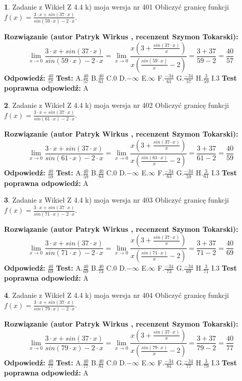 \documentclass[12pt, a4paper]{article}
\theoremstyle{definition} %
\newtheorem{zad}{}
\newcommand{\zadStart}[1]{\begin{zad}#1\newline}
\newcommand{\zadStop}{\end{zad}}
\newcommand{\rozwStart}[2]{\noindent \textbf{Rozwiązanie (autor #1 , recenzent #2): }\newline}
\newcommand{\rozwStop}{\newline}
\newcommand{\odpStart}{\noindent \textbf{Odpowiedź:}\newline}
\newcommand{\odpStop}{\newline}
\newcommand{\testStart}{\noindent \textbf{Test:}\newline}
\newcommand{\testStop}{\newline}
\newcommand{\kluczStart}{\noindent \textbf{Test poprawna odpowiedź:}\newline}
\newcommand{\kluczStop}{\newline}
\begin{document}
\zadStart{Zadanie z Wikieł Z 4.4 k) moja wersja nr 401}
Obliczyć granicę funkcji $f(x)=\frac{3\cdot x +sin(37\cdot x)}{sin(59\cdot x) -2\cdot x}$.
\zadStop
\rozwStart{Patryk Wirkus}{Szymon Tokarski}
$$\lim\limits_{x\to 0}\frac{3\cdot x +sin(37\cdot x)}{sin(59\cdot x) -2\cdot x}
=\lim\limits_{x\to 0}\frac{x(3+\frac{sin(37\cdot x)}{x})}{x(\frac{sin(59\cdot x)}{x}-2)}
=\frac{3+37}{59-2} = \frac{40}{57}$$
\rozwStop
\odpStart
$\frac{40}{57}$
\odpStop
\testStart
A.$\frac{40}{57}$
B.$\frac{40}{61}$
C.$0$
D.$-\infty$
E.$\infty$
F.$\frac{-34}{61}$
G.$\frac{-34}{57}$
H.$\frac{3}{59}$
I.$3$
\testStop
\kluczStart
A
\kluczStop



\zadStart{Zadanie z Wikieł Z 4.4 k) moja wersja nr 402}
Obliczyć granicę funkcji $f(x)=\frac{3\cdot x +sin(37\cdot x)}{sin(61\cdot x) -2\cdot x}$.
\zadStop
\rozwStart{Patryk Wirkus}{Szymon Tokarski}
$$\lim\limits_{x\to 0}\frac{3\cdot x +sin(37\cdot x)}{sin(61\cdot x) -2\cdot x}
=\lim\limits_{x\to 0}\frac{x(3+\frac{sin(37\cdot x)}{x})}{x(\frac{sin(61\cdot x)}{x}-2)}
=\frac{3+37}{61-2} = \frac{40}{59}$$
\rozwStop
\odpStart
$\frac{40}{59}$
\odpStop
\testStart
A.$\frac{40}{59}$
B.$\frac{40}{63}$
C.$0$
D.$-\infty$
E.$\infty$
F.$\frac{-34}{63}$
G.$\frac{-34}{59}$
H.$\frac{3}{61}$
I.$3$
\testStop
\kluczStart
A
\kluczStop



\zadStart{Zadanie z Wikieł Z 4.4 k) moja wersja nr 403}
Obliczyć granicę funkcji $f(x)=\frac{3\cdot x +sin(37\cdot x)}{sin(71\cdot x) -2\cdot x}$.
\zadStop
\rozwStart{Patryk Wirkus}{Szymon Tokarski}
$$\lim\limits_{x\to 0}\frac{3\cdot x +sin(37\cdot x)}{sin(71\cdot x) -2\cdot x}
=\lim\limits_{x\to 0}\frac{x(3+\frac{sin(37\cdot x)}{x})}{x(\frac{sin(71\cdot x)}{x}-2)}
=\frac{3+37}{71-2} = \frac{40}{69}$$
\rozwStop
\odpStart
$\frac{40}{69}$
\odpStop
\testStart
A.$\frac{40}{69}$
B.$\frac{40}{73}$
C.$0$
D.$-\infty$
E.$\infty$
F.$\frac{-34}{73}$
G.$\frac{-34}{69}$
H.$\frac{3}{71}$
I.$3$
\testStop
\kluczStart
A
\kluczStop



\zadStart{Zadanie z Wikieł Z 4.4 k) moja wersja nr 404}
Obliczyć granicę funkcji $f(x)=\frac{3\cdot x +sin(37\cdot x)}{sin(79\cdot x) -2\cdot x}$.
\zadStop
\rozwStart{Patryk Wirkus}{Szymon Tokarski}
$$\lim\limits_{x\to 0}\frac{3\cdot x +sin(37\cdot x)}{sin(79\cdot x) -2\cdot x}
=\lim\limits_{x\to 0}\frac{x(3+\frac{sin(37\cdot x)}{x})}{x(\frac{sin(79\cdot x)}{x}-2)}
=\frac{3+37}{79-2} = \frac{40}{77}$$
\rozwStop
\odpStart
$\frac{40}{77}$
\odpStop
\testStart
A.$\frac{40}{77}$
B.$\frac{40}{81}$
C.$0$
D.$-\infty$
E.$\infty$
F.$\frac{-34}{81}$
G.$\frac{-34}{77}$
H.$\frac{3}{79}$
I.$3$
\testStop
\kluczStart
A
\kluczStop
\end{document}
